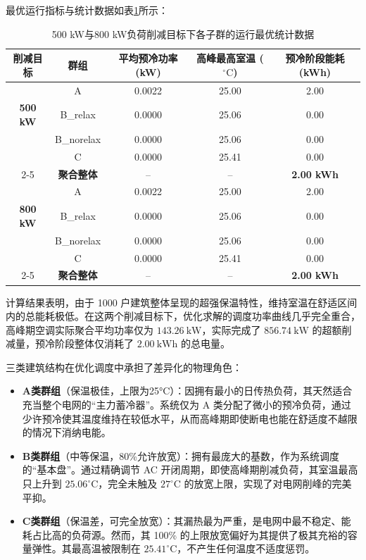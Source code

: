 \documentclass[12pt,a4paper]{article}
\begin{document}
最优运行指标与统计数据如表\ref{tab:task2_res}所示：

\begin{table}[H]
    \centering
    \caption{500 kW与800 kW负荷削减目标下各子群的运行最优统计数据}
    \label{tab:task2_res}
    \begin{tabular}{ccccc}
        \toprule
        \textbf{削减目标} & \textbf{群组} & \textbf{平均预冷功率 (kW)} & \textbf{高峰最高室温 ($^\circ\text{C}$)} & \textbf{预冷阶段能耗 (kWh)} \\ \midrule
        & A & 0.0022 & 25.00 & 2.00 \\
        \textbf{500 kW} & B\_relax & 0.0000 & 25.06 & 0.00 \\
        & B\_norelax & 0.0000 & 25.06 & 0.00 \\
        & C & 0.0000 & 25.41 & 0.00 \\ \cmidrule{2-5}
        & \textbf{聚合整体} & -- & -- & \textbf{2.00 kWh} \\ \midrule
        & A & 0.0022 & 25.00 & 2.00 \\
        \textbf{800 kW} & B\_relax & 0.0000 & 25.06 & 0.00 \\
        & B\_norelax & 0.0000 & 25.06 & 0.00 \\
        & C & 0.0000 & 25.41 & 0.00 \\ \cmidrule{2-5}
        & \textbf{聚合整体} & -- & -- & \textbf{2.00 kWh} \\
        \bottomrule
    \end{tabular}
\end{table}

计算结果表明，由于 1000 户建筑整体呈现的超强保温特性，维持室温在舒适区间内的总能耗极低。在这两个削减目标下，优化求解的调度功率曲线几乎完全重合，高峰期空调实际聚合平均功率仅为 $143.26\ \text{kW}$，实际完成了 $856.74\ \text{kW}$ 的超额削减量，预冷阶段整体仅消耗了 $2.00\ \text{kWh}$ 的总电量。

三类建筑结构在优化调度中承担了差异化的物理角色：
\begin{itemize}
    \item \textbf{A类群组}（保温极佳，上限为25°C）：因拥有最小的日传热负荷，其天然适合充当整个电网的“主力蓄冷器”。系统仅为 A 类分配了微小的预冷负荷，通过少许预冷使其温度维持在较低水平，从而高峰期即使断电也能在舒适度不越限的情况下消纳电能。
    \item \textbf{B类群组}（中等保温，80\%允许放宽）：拥有最庞大的基数，作为系统调度的“基本盘”。通过精确调节 AC 开闭周期，即使高峰期削减负荷，其室温最高只上升到 $25.06^\circ\text{C}$，完全未触及 $27^\circ\text{C}$ 的放宽上限，实现了对电网削峰的完美平抑。
    \item \textbf{C类群组}（保温差，可完全放宽）：其漏热最为严重，是电网中最不稳定、能耗占比高的负荷源。然而，其 100\% 的上限放宽偏好为其提供了极其充裕的容量弹性。其最高温被限制在 $25.41^\circ\text{C}$，不产生任何温度不适度惩罚。
\end{itemize}
\end{document}
